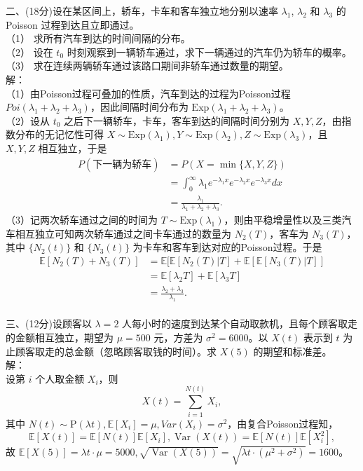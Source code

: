 \documentclass[UTF8]{ctexart}
\begin{document}
\noindent 二、(18分)设在某区间上，轿车，卡车和客车独立地分别以速率 $\lambda_1$, $\lambda_2$ 和 $\lambda_3$ 的 Poisson 过程到达且立即通过。\\
（1） 求所有汽车到达的时间间隔的分布。\\
（2） 设在 $t_0$ 时刻观察到一辆轿车通过，求下一辆通过的汽车仍为轿车的概率。\\
（3） 求在连续两辆轿车通过该路口期间非轿车通过数量的期望。\\
解：\\
（1）由Poisson过程可叠加的性质，汽车到达的过程为Poisson过程 $Poi(\lambda_1+\lambda_2+\lambda_3)$，因此间隔时间分布为 $\mathrm{Exp}(\lambda_1+\lambda_2+\lambda_3)$。\\
（2）设从 $t_0$ 之后下一辆轿车，卡车，客车到达的间隔时间分别为 $X,Y,Z$，由指数分布的无记忆性可得 $X\sim \mathrm{Exp}(\lambda_1),Y\sim \mathrm{Exp}(\lambda_2),Z\sim \mathrm{Exp}(\lambda_3)$，且 $X,Y,Z$ 相互独立，于是
$$
\begin{aligned}
	P(\mbox{下一辆为轿车})&=P(X=\min\{X,Y,Z\})\\&=\int_{0}^\infty \lambda_1e^{-\lambda_1x}e^{-\lambda_2x}e^{-\lambda_3x}dx\\&=\frac{\lambda_1}{\lambda_1+\lambda_2+\lambda_3}.
\end{aligned}
$$
（3）记两次轿车通过之间的时间为 $T\sim \mathrm{Exp}(\lambda_1)$，则由平稳增量性以及三类汽车相互独立可知两次轿车通过之间卡车通过的数量为 $N_2(T)$，客车为 $N_3(T)$，其中 $\{N_2(t)\}$ 和 $\{N_3(t)\}$ 为卡车和客车到达对应的Poisson过程。于是
$$
\begin{aligned}
	\mathbb{E}[N_2(T)+N_3(T)]&=\mathbb{E}[\mathbb{E}[N_2(T)|T]+\mathbb{E}[\mathbb{E}[N_3(T)|T]]\\
	&=\mathbb{E}[\lambda_2T]+\mathbb{E}[\lambda_3T]\\
	&=\frac{\lambda_2+\lambda_3}{\lambda_1}.
\end{aligned}
$$\\


\noindent 三、(12分)设顾客以 $\lambda = 2$ 人每小时的速度到达某个自动取款机，且每个顾客取走的金额相互独立，期望为 $\mu = 500$ 元，方差为 $\sigma^2 = 6000$。以 $X(t)$ 表示到 $t$ 为止顾客取走的总金额（忽略顾客取钱的时间）。求 $X(5)$ 的期望和标准差。\\
解：\\
设第 $i$ 个人取金额 $X_i$，则$$X(t)=\sum_{i=1}^{N(t)}X_i,$$
其中 $N(t) \sim \mathrm{P}(\lambda t),\mathbb{E}[X_i]=\mu,Var(X_i)=\sigma^2$，由复合Poisson过程知，
$$\mathbb{E}[X(t)]=\mathbb{E}[N(t)]\mathbb{E}[X_i],\operatorname{Var}(X(t))=\mathbb{E}[N(t)]\mathbb{E}[X_i^2],$$
故 $\mathbb{E}[X(5)]=\lambda t \cdot \mu=5000,\sqrt{\operatorname{Var}(X(5))}=\sqrt{\lambda t \cdot(\mu^2+\sigma^2)}=1600$。\\
\end{document}
